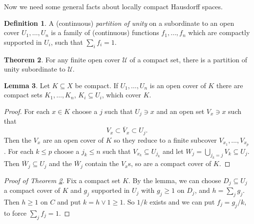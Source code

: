 \documentclass[12pt]{report}
\newcommand{\dfn}[1]{\emph{#1}\index{#1}}
\theoremstyle{definition}
\newtheorem{theorem}{Theorem}[chapter]
\newtheorem{lemma}[theorem]{Lemma}
\newtheorem{definition}[theorem]{Definition}
\begin{document}
Now we need some general facts about locally compact Hausdorff spaces.
\begin{definition}
    A (continuous) \dfn{partition of unity} on a subordinate to an open cover $U_1, \dots, U_n$ is a family of (continuous) functions $f_1, \dots, f_n$ which are compactly supported in $U_i$, such that $\sum_i f_i = 1$.
\end{definition}
\begin{theorem}
    \label{partitions of unity}
    For any finite open cover $\mathcal U$ of a compact set, there is a partition of unity subordinate to $\mathcal U$.
\end{theorem}
\begin{lemma}
    Let $K \subseteq X$ be compact. If $U_1, \dots, U_n$ is an open cover of $K$ there are compact sets $K_1, \dots, K_n$, $K_i \subseteq U_i$, which cover $K$.
\end{lemma}
\begin{proof}
    For each $x \in K$ choose a $j$ such that $U_j \ni x$ and an open set $V_x \ni x$ such that
    $$V_x \subset \overline V_x \subset U_j.$$
    Then the $V_x$ are an open cover of $K$ so they reduce to a finite subcover $V_{x_1}, \dots, V_{x_p}$. For each $k \leq p$ choose a $j_k \leq n$ such that $V_{x_k} \subseteq U_{j_k}$ and let $W_j = \bigcup_{j_k=j} V_k \subseteq U_j$. Then $\overline W_j \subseteq U_j$ and the $\overline W_j$ contain the $V_x$s, so are a compact cover of $K$.
\end{proof}
\begin{proof}[Proof of Theorem \ref{partitions of unity}]
    Fix a compact set $K$. By the lemma, we can choose $D_j \subseteq U_j$ a compact cover of $K$ and $g_j$ supported in $U_j$ with $g_j \geq 1$ on $D_j$, and $h = \sum_j g_j$. Then $h \geq 1$ on $C$ and put $k = h \vee 1 \geq 1$. So $1/k$ exists and we can put $f_j = g_j/k$, to force $\sum_j f_j = 1$.
\end{proof}
\end{document}
